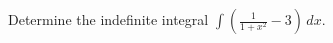 \documentclass{ximera}
\author{Gregory Hartman \and Matthew Carr}
\begin{document}
\begin{exercise}

Determine the indefinite integral $\displaystyle \int\left(\frac{1}{1+x^2}-3\right)\, dx$.

\begin{prompt}
\begin{multipleChoice}
\end{multipleChoice}
\end{prompt}
\end{exercise}
\end{document}
